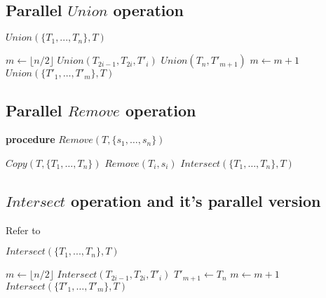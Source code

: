 \subsection{Parallel $Union$ operation}
\PROCEDURE $Union(\{T_1, ..., T_n\}, T)$
\begin{algorithmic}[1]
	\STATE $m \gets \lfloor n/2 \rfloor$
  	\STATE $Union(T_{2i-1}, T_{2i}, T'_i)$
  \ENDFOR
    \STATE $Union(T_n, T'_{m+1}) $
    \STATE $m \gets m+1$
  \ENDIF
  \STATE $Union(\{T'_1, \dots, T'_m\}, T)$
\end{algorithmic}

\subsection{Parallel $Remove$ operation}
{\bf procedure} $Remove(T, \{s_1, \dots, s_n\})$
\begin{algorithmic}[1]
	\STATE $Copy(T, \{T_1, \dots, T_n\})$
  	\STATE $Remove(T_i, s_i)$
  \ENDFOR
  \STATE $Intersect(\{T_1, \dots, T_n\}, T)$
\end{algorithmic}

\subsection{$Intersect$ operation and it's parallel version}

Refer to \cite{Dantsin:2003}

\PROCEDURE $Intersect(\{T_1, ..., T_n\}, T)$
\begin{algorithmic}[1]
	\STATE $m \gets \lfloor n/2 \rfloor$
  	\STATE $Intersect(T_{2i-1}, T_{2i}, T'_i)$
  \ENDFOR
    \STATE $T'_{m+1} \gets T_n$
    \STATE $m \gets m+1$
  \ENDIF
  \STATE $Intersect(\{T'_1, \dots, T'_m\}, T)$
\end{algorithmic}

